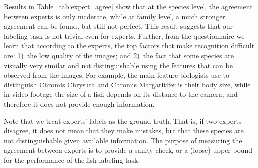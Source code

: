 Results in Table~\ref{tab:expert_agree} show that at the species
level, the agreement between experts is only moderate, while at family
level, a much stronger agreement can be found, but still not perfect.
This result suggests that our labeling task is not trivial even for
experts. 
%
Further, from the questionnaire we learn that according to the
experts, the top factors that make recognition difficult are: 1)~the
low quality of the images; and 2)~the fact that some species are
visually very similar and not distinguishable using the features that
can be observed from the images.  For example, the main feature
biologists use to distinguish Chromis Chrysura and Chromis
Margaritifer is their body size, while in video footage the size of a
fish depends on its distance to the camera, and therefore it does not
provide enough information. 
%

Note that we treat experts' labels as the ground truth. That is, if
two experts disagree, it does not mean that they make mistakes, but
that these species are not distinguishable given available
information.  The purpose of measuring the agreement between experts
is to provide a sanity check, or a (loose) upper bound for the
performance of the fish labeling task. 

\fi

